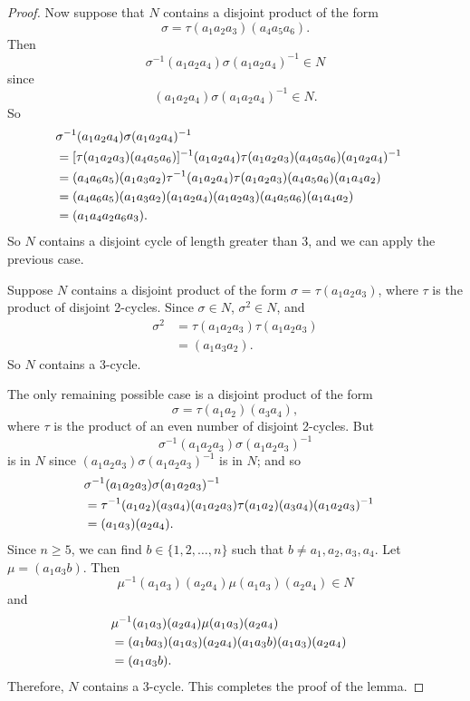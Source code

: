 \begin{proof}
 
Now suppose that $N$ contains a disjoint product of the form
\[
\sigma = \tau(a_1 a_2 a_3)(a_4 a_5 a_6).
\]
Then
\[
\sigma^{-1}(a_1 a_2 a_4)\sigma(a_1 a_2 a_4)^{-1} \in N
\]
since
\[
(a_1 a_2 a_4)\sigma(a_1 a_2 a_4)^{-1} \in N.
\]
So
\begin{align*}
\lefteqn{\sigma^{-1}(a_1 a_2 a_4)\sigma(a_1 a_2 a_4)^{-1} } \\
& = [ \tau (a_1 a_2 a_3) (a_4 a_5 a_6) ]^{-1}  (a_1 a_2 a_4) 
      \tau (a_1 a_2 a_3) (a_4 a_5 a_6) (a_1 a_2 a_4)^{-1} \\
& = (a_4 a_6 a_5) (a_1 a_3 a_2) \tau^{-1}(a_1 a_2 a_4)  
      \tau (a_1 a_2 a_3) (a_4 a_5 a_6) (a_1 a_4 a_2) \\
& = (a_4 a_6 a_5)(a_1 a_3 a_2) (a_1 a_2 a_4)
      (a_1 a_2 a_3) (a_4 a_5 a_6)(a_1 a_4 a_2) \\
& = (a_1 a_4 a_2 a_6 a_3).
\end{align*}
So $N$ contains a disjoint cycle of length greater than 3, and we can
apply the previous case. 
 
 
Suppose $N$ contains a disjoint product of the form $\sigma = \tau(a_1
a_2 a_3)$, where $\tau$ is the product of disjoint 2-cycles. Since
$\sigma \in N$, $\sigma^2 \in N$, and
\begin{align*}
\sigma^2
& = \tau(a_1 a_2 a_3)\tau(a_1 a_2 a_3) \\
& =(a_1 a_3 a_2).
\end{align*}
So $N$ contains a 3-cycle.
 
 
The only remaining possible case is a disjoint product of the form
\[
\sigma = \tau (a_1 a_2) (a_3 a_4),
\]
where $\tau$ is the product of an even number of disjoint 2-cycles.
But 
\[
\sigma^{-1}(a_1 a_2 a_3)\sigma(a_1 a_2 a_3)^{-1}
\]
is in $N$ since $(a_1 a_2 a_3)\sigma(a_1 a_2 a_3)^{-1}$ is in $N$; and
so 
\begin{align*}
\lefteqn{\sigma^{-1}(a_1 a_2 a_3)\sigma(a_1 a_2 a_3)^{-1} } \\
& = \tau^{-1} (a_1 a_2) (a_3 a_4) (a_1 a_2 a_3) 
      \tau (a_1 a_2)(a_3 a_4)(a_1 a_2 a_3)^{-1} \\
& = (a_1 a_3)(a_2 a_4).
\end{align*}
Since $n \geq 5$, we can find $b \in \{1, 2, \ldots, n \}$ such that
$b \neq a_1, a_2, a_3, a_4$. Let $\mu = (a_1 a_3 b)$. Then
\[
\mu^{-1} (a_1 a_3)(a_2 a_4) \mu (a_1 a_3)(a_2 a_4) \in N
\]
and
\begin{align*}
\lefteqn{\mu^{-1} (a_1 a_3)(a_2 a_4) \mu (a_1 a_3)(a_2 a_4) } \\
& = (a_1 b a_3)(a_1 a_3)(a_2 a_4) 
      (a_1 a_3 b)(a_1 a_3)(a_2 a_4) \\
& = (a_1 a_3 b ).
\end{align*}
Therefore, $N$ contains a 3-cycle. This completes the proof of the
lemma.  
\end{proof}
 

